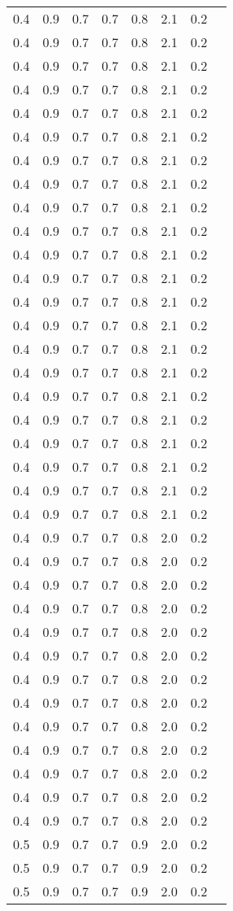 \begin{tabular}{L{1in}|L{1in}|L{1in}|L{1in}|L{1in}|L{1in}|L{1in}|L{1in}}
0.4&0.9&0.7&0.7&0.8&2.1&0.2\\
0.4&0.9&0.7&0.7&0.8&2.1&0.2\\
0.4&0.9&0.7&0.7&0.8&2.1&0.2\\
0.4&0.9&0.7&0.7&0.8&2.1&0.2\\
0.4&0.9&0.7&0.7&0.8&2.1&0.2\\
0.4&0.9&0.7&0.7&0.8&2.1&0.2\\
0.4&0.9&0.7&0.7&0.8&2.1&0.2\\
0.4&0.9&0.7&0.7&0.8&2.1&0.2\\
0.4&0.9&0.7&0.7&0.8&2.1&0.2\\
0.4&0.9&0.7&0.7&0.8&2.1&0.2\\
0.4&0.9&0.7&0.7&0.8&2.1&0.2\\
0.4&0.9&0.7&0.7&0.8&2.1&0.2\\
0.4&0.9&0.7&0.7&0.8&2.1&0.2\\
0.4&0.9&0.7&0.7&0.8&2.1&0.2\\
0.4&0.9&0.7&0.7&0.8&2.1&0.2\\
0.4&0.9&0.7&0.7&0.8&2.1&0.2\\
0.4&0.9&0.7&0.7&0.8&2.1&0.2\\
0.4&0.9&0.7&0.7&0.8&2.1&0.2\\
0.4&0.9&0.7&0.7&0.8&2.1&0.2\\
0.4&0.9&0.7&0.7&0.8&2.1&0.2\\
0.4&0.9&0.7&0.7&0.8&2.1&0.2\\
0.4&0.9&0.7&0.7&0.8&2.1&0.2\\
0.4&0.9&0.7&0.7&0.8&2.0&0.2\\
0.4&0.9&0.7&0.7&0.8&2.0&0.2\\
0.4&0.9&0.7&0.7&0.8&2.0&0.2\\
0.4&0.9&0.7&0.7&0.8&2.0&0.2\\
0.4&0.9&0.7&0.7&0.8&2.0&0.2\\
0.4&0.9&0.7&0.7&0.8&2.0&0.2\\
0.4&0.9&0.7&0.7&0.8&2.0&0.2\\
0.4&0.9&0.7&0.7&0.8&2.0&0.2\\
0.4&0.9&0.7&0.7&0.8&2.0&0.2\\
0.4&0.9&0.7&0.7&0.8&2.0&0.2\\
0.4&0.9&0.7&0.7&0.8&2.0&0.2\\
0.4&0.9&0.7&0.7&0.8&2.0&0.2\\
0.4&0.9&0.7&0.7&0.8&2.0&0.2\\
0.5&0.9&0.7&0.7&0.9&2.0&0.2\\
0.5&0.9&0.7&0.7&0.9&2.0&0.2\\
0.5&0.9&0.7&0.7&0.9&2.0&0.2\\

\end{tabular}
